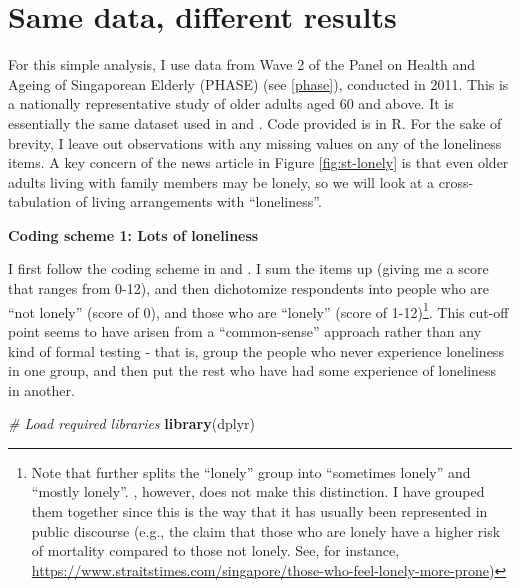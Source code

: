 \documentclass[openany]{book}
\newenvironment{Shaded}{\begin{snugshade}}{\end{snugshade}}
\newcommand{\KeywordTok}[1]{\textcolor[rgb]{0.13,0.29,0.53}{\textbf{#1}}}
\newcommand{\CommentTok}[1]{\textcolor[rgb]{0.56,0.35,0.01}{\textit{#1}}}
\newcommand{\NormalTok}[1]{#1}
\let\rmarkdownfootnote\footnote%
\def\footnote{\protect\rmarkdownfootnote}
\begin{document}
\section{Same data, different
results}\label{same-data-different-results}

For this simple analysis, I use data from Wave 2 of the Panel on Health
and Ageing of Singaporean Elderly (PHASE) (see \ref{phase}), conducted
in 2011. This is a nationally representative study of older adults aged
60 and above. It is essentially the same dataset used in
\citet{lim_association_2017} and \citet{chan_loneliness_2015}. Code
provided is in R. For the sake of brevity, I leave out observations with
any missing values on any of the loneliness items. A key concern of the
news article in Figure \ref{fig:st-lonely} is that even older adults
living with family members may be lonely, so we will look at a
cross-tabulation of living arrangements with ``loneliness''.

\textbf{Coding scheme 1: Lots of loneliness}

I first follow the coding scheme in \citet{lim_association_2017} and
\citet{chan_loneliness_2015}. I sum the items up (giving me a score that
ranges from 0-12), and then dichotomize respondents into people who are
``not lonely'' (score of 0), and those who are ``lonely'' (score of
1-12)\footnote{Note that \citet{chan_loneliness_2015} further splits the
  ``lonely'' group into ``sometimes lonely'' and ``mostly lonely''.
  \citet{lim_association_2017}, however, does not make this distinction.
  I have grouped them together since this is the way that it has usually
  been represented in public discourse (e.g., the claim that those who
  are lonely have a higher risk of mortality compared to those not
  lonely. See, for instance,
  \url{https://www.straitstimes.com/singapore/those-who-feel-lonely-more-prone})}.
This cut-off point seems to have arisen from a ``common-sense'' approach
rather than any kind of formal testing - that is, group the people who
never experience loneliness in one group, and then put the rest who have
had some experience of loneliness in another.

\begin{Shaded}
\begin{Highlighting}[]
\CommentTok{# Load required libraries}
\KeywordTok{library}\NormalTok{(dplyr)}
\end{Highlighting}
\end{Shaded}
\end{document}
